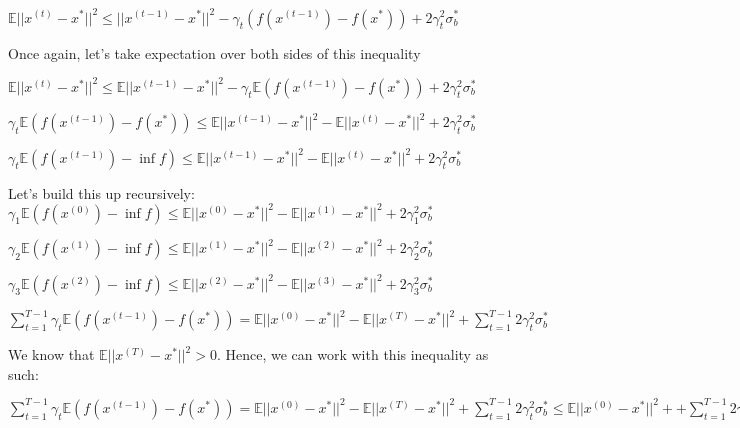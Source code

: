 $\mathbb{E}||x^{(t)} - x^*||^2 \leq ||x^{(t - 1)} - x^*||^2 - \gamma_t (f(x^{(t - 1)}) - f(x^*)) + 2\gamma_t^2 \sigma_b^* $ \newline 

Once again, let's take expectation over both sides of this inequality \newline 

$\mathbb{E}||x^{(t)} - x^*||^2 \leq \mathbb{E} ||x^{(t - 1)} - x^*||^2 - \gamma_t \mathbb{E} (f(x^{(t - 1)}) - f(x^*)) + 2\gamma_t^2 \sigma_b^* $ \newline 

$\gamma_t \mathbb{E} (f(x^{(t - 1)}) - f(x^*)) \leq \mathbb{E} ||x^{(t - 1)} - x^*||^2 - \mathbb{E}||x^{(t)} - x^*||^2 + 2\gamma_t^2 \sigma_b^* $ \newline 

$\gamma_t \mathbb{E} (f(x^{(t - 1)}) - \inf f) \leq \mathbb{E} ||x^{(t - 1)} - x^*||^2 - \mathbb{E}||x^{(t)} - x^*||^2 + 2\gamma_t^2 \sigma_b^* $ \newline 

Let's build this up recursively: \newline 
$\gamma_1 \mathbb{E} (f(x^{(0)}) - \inf f) \leq \mathbb{E} ||x^{(0)} - x^*||^2 - \mathbb{E}||x^{(1)} - x^*||^2 + 2\gamma_1^2 \sigma_b^* $ \newline 


$\gamma_2 \mathbb{E} (f(x^{(1)}) - \inf f) \leq \mathbb{E} ||x^{(1)} - x^*||^2 - \mathbb{E}||x^{(2)} - x^*||^2 + 2\gamma_2^2 \sigma_b^* $ \newline 

$\gamma_3 \mathbb{E} (f(x^{(2)}) - \inf f) \leq \mathbb{E} ||x^{(2)} - x^*||^2 - \mathbb{E}||x^{(3)} - x^*||^2 + 2\gamma_3^2 \sigma_b^* $ \newline 

$\sum_{t=1}^{T - 1} \gamma_t \mathbb{E} (f(x^{(t - 1)}) - f(x^*)) = \mathbb{E} ||x^{(0)} - x^*||^2 - \mathbb{E}||x^{(T)} - x^*||^2 +  \sum_{t=1}^{T - 1} 2 \gamma_t^2 \sigma_b^*$

We know that $\mathbb{E}||x^{(T)} - x^*||^2 > 0$. Hence, we can work with this inequality as such: \newline 

$\sum_{t=1}^{T - 1} \gamma_t \mathbb{E} (f(x^{(t - 1)}) - f(x^*)) = \mathbb{E} ||x^{(0)} - x^*||^2 - \mathbb{E}||x^{(T)} - x^*||^2 +  \sum_{t=1}^{T - 1} 2 \gamma_t^2 \sigma_b^* \leq \mathbb{E} ||x^{(0)} - x^*||^2 + +  \sum_{t=1}^{T - 1} 2 \gamma_t^2 \sigma_b^*$ \newline 

